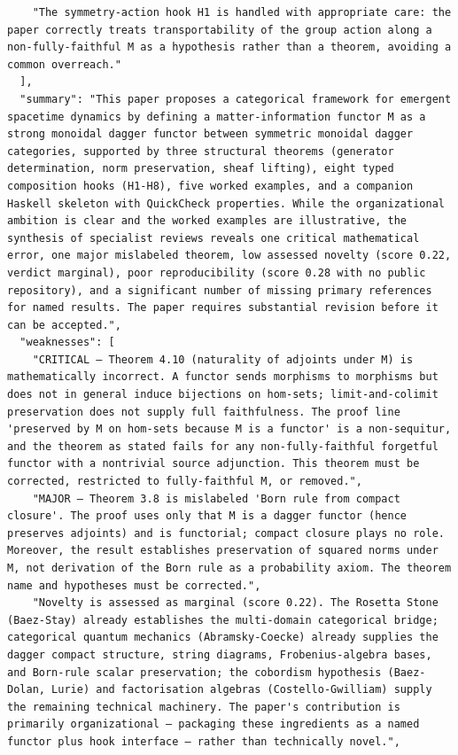 \documentclass[11pt]{article}
\begin{document}
\begin{verbatim}
    "The symmetry-action hook H1 is handled with appropriate care: the paper correctly treats transportability of the group action along a non-fully-faithful M as a hypothesis rather than a theorem, avoiding a common overreach."
  ],
  "summary": "This paper proposes a categorical framework for emergent spacetime dynamics by defining a matter-information functor M as a strong monoidal dagger functor between symmetric monoidal dagger categories, supported by three structural theorems (generator determination, norm preservation, sheaf lifting), eight typed composition hooks (H1-H8), five worked examples, and a companion Haskell skeleton with QuickCheck properties. While the organizational ambition is clear and the worked examples are illustrative, the synthesis of specialist reviews reveals one critical mathematical error, one major mislabeled theorem, low assessed novelty (score 0.22, verdict marginal), poor reproducibility (score 0.28 with no public repository), and a significant number of missing primary references for named results. The paper requires substantial revision before it can be accepted.",
  "weaknesses": [
    "CRITICAL — Theorem 4.10 (naturality of adjoints under M) is mathematically incorrect. A functor sends morphisms to morphisms but does not in general induce bijections on hom-sets; limit-and-colimit preservation does not supply full faithfulness. The proof line 'preserved by M on hom-sets because M is a functor' is a non-sequitur, and the theorem as stated fails for any non-fully-faithful forgetful functor with a nontrivial source adjunction. This theorem must be corrected, restricted to fully-faithful M, or removed.",
    "MAJOR — Theorem 3.8 is mislabeled 'Born rule from compact closure'. The proof uses only that M is a dagger functor (hence preserves adjoints) and is functorial; compact closure plays no role. Moreover, the result establishes preservation of squared norms under M, not derivation of the Born rule as a probability axiom. The theorem name and hypotheses must be corrected.",
    "Novelty is assessed as marginal (score 0.22). The Rosetta Stone (Baez-Stay) already establishes the multi-domain categorical bridge; categorical quantum mechanics (Abramsky-Coecke) already supplies the dagger compact structure, string diagrams, Frobenius-algebra bases, and Born-rule scalar preservation; the cobordism hypothesis (Baez-Dolan, Lurie) and factorisation algebras (Costello-Gwilliam) supply the remaining technical machinery. The paper's contribution is primarily organizational — packaging these ingredients as a named functor plus hook interface — rather than technically novel.",

\end{verbatim}
\end{document}
